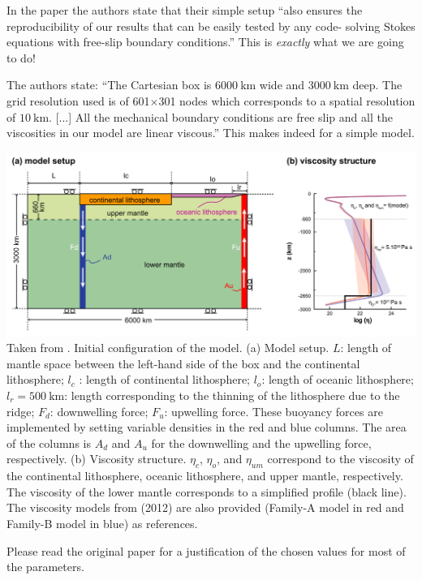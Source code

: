 In the paper the authors state that their simple setup
``also ensures the reproducibility of our results that can be easily tested by any code-
solving Stokes equations with free-slip boundary conditions.''
This is {\it exactly} what we are going to do!

The authors state: ``The Cartesian box is $6000~\si{\km}$ wide and $3000~\si{\km}$
deep. The grid resolution used is of 601$\times$301 nodes which
corresponds to a spatial resolution of $10~\si{\km}$. [...] 
All the mechanical boundary conditions are free slip and all the viscosities 
in our model are linear viscous.'' This makes indeed for a simple model.

\begin{center}
\includegraphics[width=15cm]{python_codes/fieldstone_143/images/yahb13_a}\\
{\captionfont 
Taken from \cite{yahb13}. Initial configuration of the model. 
(a) Model setup. $L$: length of mantle space between the left-hand 
side of the box and the continental lithosphere; $l_c$ : length of continental lithosphere; 
$l_o$: length of oceanic lithosphere; 
$l_r=500~\si{\km}$: length corresponding to the thinning of the lithosphere due to the ridge; 
$F_d$: downwelling force; 
$F_u$: upwelling force. These buoyancy forces are implemented by setting variable
densities in the red and blue columns. The area of the columns is $A_d$ and $A_u$ for the downwelling and the
upwelling force, respectively. (b) Viscosity structure. $\eta_c$, $\eta_o$, and $\eta_{um}$ correspond
to the viscosity of the continental lithosphere, oceanic lithosphere, and upper mantle, respectively. The
viscosity of the lower mantle corresponds to a simplified profile (black line). The viscosity models from
\cite{civs12} (2012) are also provided (Family-A model in red and Family-B model in blue) as references. }
\end{center}

Please read the original paper for a justification of the chosen values for most 
of the parameters.

